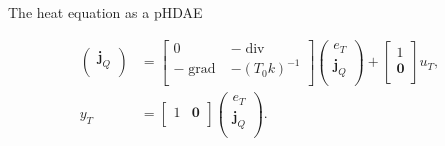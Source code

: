\documentclass[aspectratio=169]{ISAE-Beamer}
\DeclareMathOperator*{\grad}{grad}
\renewcommand{\div}{\operatorname{div}}
\begin{document}
\begin{frame}{The heat equation as a pHDAE}
\begin{overlayarea}{\textwidth}{\textheight}
{\begin{equation*}
\begin{aligned}
\begin{pmatrix}
\bm{j}_Q \\
\end{pmatrix} &= 
\begin{bmatrix}
0 & -\div \\
-\grad & -(T_0 k)^{-1} \\
\end{bmatrix}
\begin{pmatrix}
e_T \\
\bm{j}_Q \\
\end{pmatrix} + 
\begin{bmatrix}
1 \\
\bm{0} \\
\end{bmatrix} u_T, \\
y_T &= \begin{bmatrix}
1 & \bm{0} \\
\end{bmatrix} \begin{pmatrix}
e_T \\
\bm{j}_Q \\
\end{pmatrix}.
\end{aligned}
\end{equation*}
}
\end{overlayarea}

\end{frame}
\end{document}
